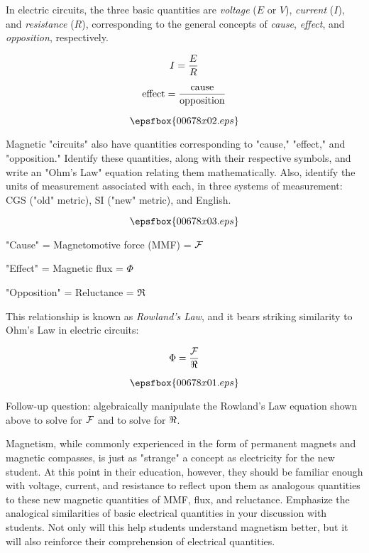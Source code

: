 

In electric circuits, the three basic quantities are {\it voltage} ($E$ or $V$), {\it current} ($I$), and {\it resistance} ($R$), corresponding to the general concepts of {\it cause}, {\it effect}, and {\it opposition}, respectively.

$$I = {E \over R}$$

$$\hbox{effect} = {\hbox{cause} \over \hbox{opposition}}$$

$$\epsfbox{00678x02.eps}$$

Magnetic "circuits" also have quantities corresponding to "cause," "effect," and "opposition."  Identify these quantities, along with their respective symbols, and write an "Ohm's Law" equation relating them mathematically.  Also, identify the units of measurement associated with each, in three systems of measurement: CGS ("old" metric), SI ("new" metric), and English.

$$\epsfbox{00678x03.eps}$$







"Cause" = Magnetomotive force (MMF) = ${\cal F}$

"Effect" = Magnetic flux = $\Phi$

"Opposition" = Reluctance = $\Re$

\vskip 10pt

This relationship is known as {\it Rowland's Law}, and it bears striking similarity to Ohm's Law in electric circuits:

$$\Phi = {{\cal F} \over \Re}$$

$$\epsfbox{00678x01.eps}$$

\vskip 10pt

Follow-up question: algebraically manipulate the Rowland's Law equation shown above to solve for $\cal F$ and to solve for $\cal \Re$.







Magnetism, while commonly experienced in the form of permanent magnets and magnetic compasses, is just as "strange" a concept as electricity for the new student.  At this point in their education, however, they should be familiar enough with voltage, current, and resistance to reflect upon them as analogous quantities to these new magnetic quantities of MMF, flux, and reluctance.  Emphasize the analogical similarities of basic electrical quantities in your discussion with students.  Not only will this help students understand magnetism better, but it will also reinforce their comprehension of electrical quantities.




